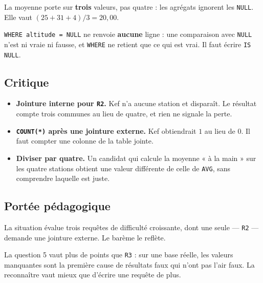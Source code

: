 La moyenne porte sur \textbf{trois} valeurs, pas quatre : les agrégats ignorent
les \lstinline{NULL}. Elle vaut $(25 + 31 + 4)/3 = 20{,}00$.

\lstinline{WHERE altitude = NULL} ne renvoie \textbf{aucune} ligne : une
comparaison avec \lstinline{NULL} n'est ni vraie ni fausse, et
\lstinline{WHERE} ne retient que ce qui est vrai. Il faut écrire
\lstinline{IS NULL}.

\subsection*{Critique}

\begin{itemize}
  \item \textbf{Jointure interne pour \lstinline{R2}.} Kef n'a aucune station et
    disparaît. Le résultat compte trois communes au lieu de quatre, et rien ne
    signale la perte.
  \item \textbf{\lstinline{COUNT(*)} après une jointure externe.} Kef obtiendrait
    $1$ au lieu de $0$. Il faut compter une colonne de la table jointe.
  \item \textbf{Diviser par quatre.} Un candidat qui calcule la moyenne « à la
    main » sur les quatre stations obtient une valeur différente de celle de
    \lstinline{AVG}, sans comprendre laquelle est juste.
\end{itemize}

\subsection*{Portée pédagogique}

La situation évalue trois requêtes de difficulté croissante, dont une seule
— \lstinline{R2} — demande une jointure externe. Le barème le reflète.

La question 5 vaut plus de points que \lstinline{R3} : sur une base réelle, les
valeurs manquantes sont la première cause de résultats faux qui n'ont pas l'air
faux. La reconnaître vaut mieux que d'écrire une requête de plus.
